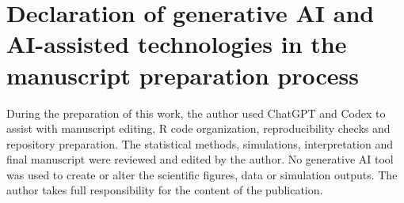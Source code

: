 \documentclass[11pt]{article}
\begin{document}
\section*{Declaration of generative AI and AI-assisted technologies in the manuscript preparation process}

During the preparation of this work, the author used ChatGPT and Codex to assist with manuscript editing, R code organization, reproducibility checks and repository preparation.  The statistical methods, simulations, interpretation and final manuscript were reviewed and edited by the author.  No generative AI tool was used to create or alter the scientific figures, data or simulation outputs.  The author takes full responsibility for the content of the publication.



\end{document}
